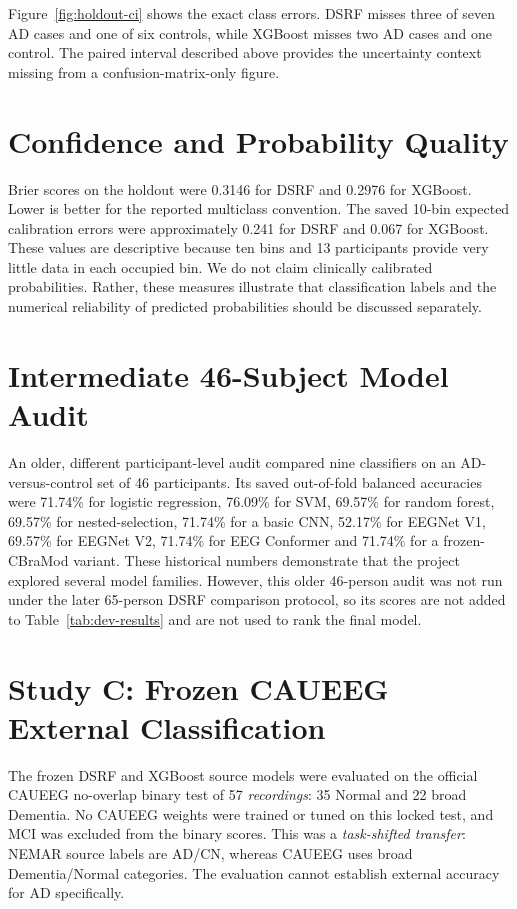 Figure~\ref{fig:holdout-ci} shows the exact class errors. DSRF misses three of seven AD cases and one of six controls, while XGBoost misses two AD cases and one control. The paired interval described above provides the uncertainty context missing from a confusion-matrix-only figure.

\section{Confidence and Probability Quality}
Brier scores on the holdout were 0.3146 for DSRF and 0.2976 for XGBoost. Lower is better for the reported multiclass convention. The saved 10-bin expected calibration errors were approximately 0.241 for DSRF and 0.067 for XGBoost. These values are descriptive because ten bins and 13 participants provide very little data in each occupied bin. We do not claim clinically calibrated probabilities. Rather, these measures illustrate that classification labels and the numerical reliability of predicted probabilities should be discussed separately.

\section{Intermediate 46-Subject Model Audit}
An older, different participant-level audit compared nine classifiers on an AD-versus-control set of 46 participants. Its saved out-of-fold balanced accuracies were 71.74\% for logistic regression, 76.09\% for SVM, 69.57\% for random forest, 69.57\% for nested-selection, 71.74\% for a basic CNN, 52.17\% for EEGNet V1, 69.57\% for EEGNet V2, 71.74\% for EEG Conformer and 71.74\% for a frozen-CBraMod variant. These historical numbers demonstrate that the project explored several model families. However, this older 46-person audit was not run under the later 65-person DSRF comparison protocol, so its scores are not added to Table~\ref{tab:dev-results} and are not used to rank the final model.

\section{Study C: Frozen CAUEEG External Classification}
The frozen DSRF and XGBoost source models were evaluated on the official CAUEEG no-overlap binary test of 57 \emph{recordings}: 35 Normal and 22 broad Dementia. No CAUEEG weights were trained or tuned on this locked test, and MCI was excluded from the binary scores. This was a \emph{task-shifted transfer}: NEMAR source labels are AD/CN, whereas CAUEEG uses broad Dementia/Normal categories. The evaluation cannot establish external accuracy for AD specifically.

